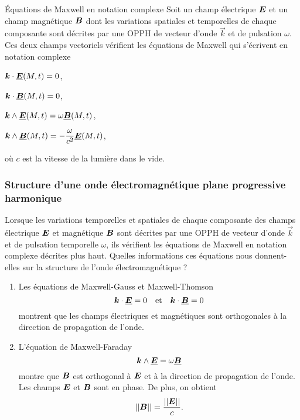 \begin{defn}{Équations de Maxwell en notation complexe}
Soit un champ électrique $\vece$ et un champ magnétique $\vecb$
dont les variations spatiales et temporelles de chaque composante sont décrites 
par une OPPH de vecteur d'onde $\vec{k}$ et de pulsation $\omega$. Ces deux champs 
vectoriels vérifient les équations de Maxwell qui s'écrivent en notation complexe

\begin{description}[labelindent=2em, itemsep=1em]
	\item[Maxwell-Gauss: ]
		$\vec{k} \cdot \complex{\vece}(M, t) = 0$,
	\item[Maxwell-Thomson: ] $\vec{k} \cdot \complex{\vecb}(M, t) = 0$,
	\item[Maxwell-Faraday: ]
		$\vec{k} \wedge \complex{\vece}(M, t) = \omega \complex{\vecb}(M, t)$,
	\item[Maxwell-Ampère: ]
		$\vec{k} \wedge \complex{\vecb}(M, t) = - \dfrac{\omega}{c^2}
		\complex{\vece}(M, t)$,
\end{description}
où $c$ est la vitesse de la lumière dans le vide.
\end{defn}


\subsubsection{Structure d'une onde électromagnétique plane progressive harmonique}
Lorsque les variations temporelles et spatiales de chaque composante des 
champs électrique $\vece$ et magnétique $\vecb$ sont décrites par une OPPH de
vecteur d'onde $\vec{k}$ et de pulsation temporelle $\omega$, ils vérifient les 
équations de Maxwell en notation complexe décrites plus haut. Quelles informations
ces équations nous donnent-elles sur la structure de l'onde électromagnétique ?

\begin{enumerate}
	\item Les équations de Maxwell-Gauss et Maxwell-Thomson
\begin{equation*}
	\vec{k} \cdot \complex{\vece} = 0 \quad \mathrm{et} \quad 
	\vec{k} \cdot \complex{\vecb} = 0
\end{equation*}
montrent que les champs électriques et magnétiques sont orthogonales à la direction
de propagation de l'onde.
	\item L'équation de Maxwell-Faraday 
	\begin{equation*}
		\vec{k} \wedge \complex{\vece} = \omega \complex{\vecb}
	\end{equation*}
	montre que $\vecb$ est orthogonal à $\vece$ et à la direction de propagation 
	de l'onde. Les champs $\vece$ et $\vecb$ sont en phase. De plus, on obtient
	\begin{equation*}
		||\vecb|| = \dfrac{||\vece||}{c}.
	\end{equation*}
\end{enumerate}


